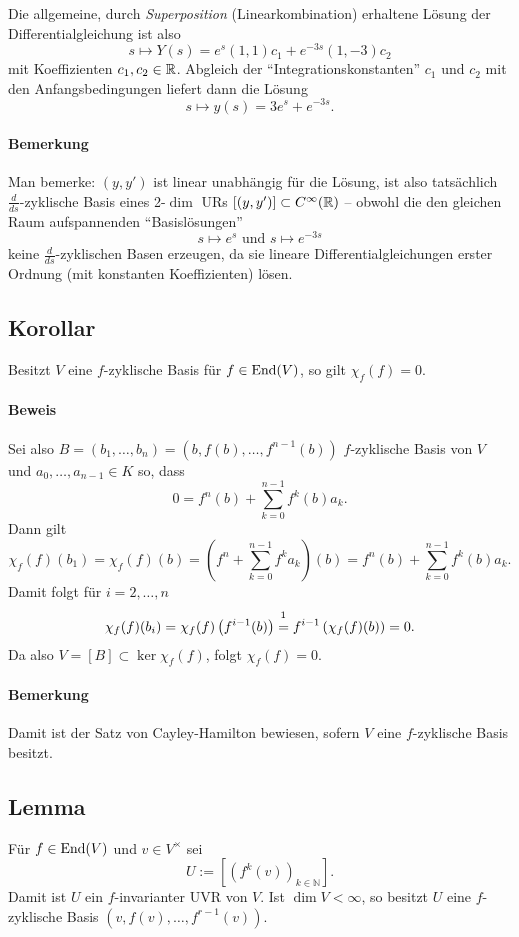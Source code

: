 	Die allgemeine, durch \emph{Superposition} (Linearkombination) erhaltene Lösung der Differentialgleichung ist also
		\[ s\mapsto Y(s) = e^s(1,1)c_1 + e^{-3s}(1,-3)c_2 \]
	mit Koeffizienten $ c_1,c_2 \in \mathbb{R} $. Abgleich der "`Integrationskonstanten"' $ c_1 $ und $ c_2 $ mit den Anfangsbedingungen liefert dann die Lösung
		\[ s \mapsto y(s) = 3e^s+e^{-3s}. \]
\paragraph{Bemerkung}
	Man bemerke: $ (y,y') $ ist linear unabhängig für die Lösung, ist also tatsächlich $ \frac{d}{ds} $-zyklische Basis eines 2-$ \dim $ URs $ [(y,y')]\subset C^\infty(\mathbb{R}) $ -- obwohl die den gleichen Raum aufspannenden "`Basislösungen"'
		\[ s\mapsto e^s \text{ und } s\mapsto e^{-3s} \]
	keine $ \frac{d}{ds} $-zyklischen Basen erzeugen, da sie lineare Differentialgleichungen erster Ordnung (mit konstanten Koeffizienten) lösen.
	
\subsection{Korollar}
\begin{Korollar}\label{korcay}
	Besitzt $ V $ eine $ f $-zyklische Basis für $ f\in\operatorname{End}(V) $, so gilt $ \chi_f(f)=0 $.
\end{Korollar}
\paragraph{Beweis}
	Sei also $ B=(b_1,\dots,b_n) =(b,f(b),\dots,f^{n-1}(b)) $ $ f $-zyklische Basis von $ V $ und $ a_0,\dots,a_{n-1}\in K $ so, dass
		\[ 0 = f^n(b)+\sum_{k=0}^{n-1}f^k(b)a_k. \]
	Dann gilt
		\[ \chi_f(f)(b_1) = \chi_f(f)(b) = \left(f^n+\sum_{k=0}^{n-1}f^ka_k\right)(b) = f^n(b)+\sum_{k=0}^{n-1}f^k(b)a_k. \]
	Damit folgt für $ i=2,\dots,n $
		\[ \chi_f(f)(b_i) = \chi_f(f)\left(f^{i-1}(b)\right) \stackrel{\footnotemark}{=} f^{i-1}\left(\chi_f(f)(b) \right) = 0. \]
	Da also $ V=[B] \subset \ker {\chi_f(f)}$, folgt $ \chi_f(f) = 0. $
\paragraph{Bemerkung}
	Damit ist der Satz von Cayley-Hamilton bewiesen, sofern $ V $ eine $ f $-zyklische Basis besitzt.
	
\subsection{Lemma}
\begin{Lemma}
	Für $ f\in\operatorname{End}(V) $ und $ v\in V^\times  $ sei
		\[ U := \left[\left(f^k(v)\right)_{k\in{\mathbb{N}}}\right]. \]
	Damit ist $ U $ ein $ f $-invarianter UVR von $ V $. Ist $ \dim V < \infty $, so besitzt $ U $ eine $ f $-zyklische Basis $ \left(v,f(v),\dots,f^{r-1}(v)\right) $.
\end{Lemma}

